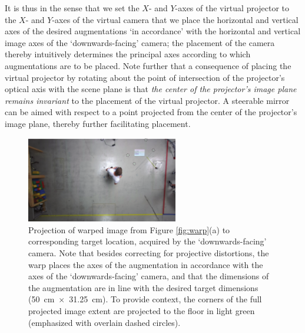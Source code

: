 \documentclass[review]{elsarticle}
\begin{document}
It is thus in the sense that we set the $X$- and $Y$-axes of the virtual projector to the $X$- and $Y$-axes of the virtual camera that we place the horizontal and vertical axes of the desired augmentations `in accordance' with the horizontal and vertical image axes of the `downwards-facing' camera; the placement of the camera thereby intuitively determines the principal axes according to which augmentations are to be placed. Note further that a consequence of placing the virtual projector by rotating about the point of intersection of the projector's optical axis with the scene plane is that \textit{the center of the projector's image plane remains invariant} to the placement of the virtual projector. A steerable mirror can be aimed with respect to a point projected from the center of the projector's image plane, thereby further facilitating placement.

\begin{figure}
    \centering
    \includegraphics[height=3.75cm]{images/hans_undist_.pdf}
    \caption{Projection of warped image from Figure \ref{fig:warp}(a) to corresponding target location, acquired by the `downwards-facing' camera. Note that besides correcting for projective distortions, the warp places the axes of the augmentation in accordance with the axes of the `downwards-facing' camera, and that the dimensions of the augmentation are in line with the desired target dimensions (50~cm~$\times$~31.25~cm). To provide context, the corners of the full projected image extent are projected to the floor in light green (emphasized with overlain dashed circles).}
    \label{fig:final_proj}
\end{figure}
\end{document}
